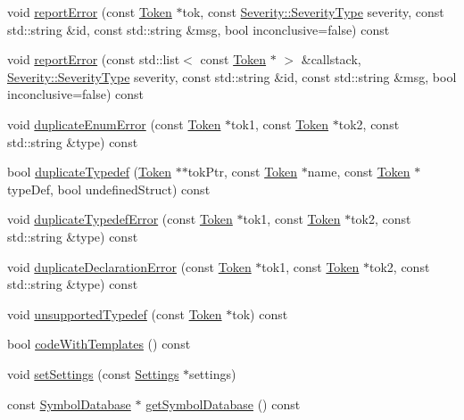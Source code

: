 \begin{DoxyCompactItemize}
\item 
void \hyperlink{class_tokenizer_a1147d0be1846ad886ad5e45c58d7d979}{report\-Error} (const \hyperlink{class_token}{Token} $\ast$tok, const \hyperlink{class_severity_ac185938ae084355bbf1790cf1a70caa6}{Severity\-::\-Severity\-Type} severity, const std\-::string \&id, const std\-::string \&msg, bool inconclusive=false) const 
\item 
void \hyperlink{class_tokenizer_a9a5827bede7b939d3f142049a84d22fc}{report\-Error} (const std\-::list$<$ const \hyperlink{class_token}{Token} $\ast$ $>$ \&callstack, \hyperlink{class_severity_ac185938ae084355bbf1790cf1a70caa6}{Severity\-::\-Severity\-Type} severity, const std\-::string \&id, const std\-::string \&msg, bool inconclusive=false) const 
\item 
void \hyperlink{class_tokenizer_a87ec82f8bb7fc338d444782cea181694}{duplicate\-Enum\-Error} (const \hyperlink{class_token}{Token} $\ast$tok1, const \hyperlink{class_token}{Token} $\ast$tok2, const std\-::string \&type) const 
\item 
bool \hyperlink{class_tokenizer_aa96ad648dc25a43c6c098fde70b3320f}{duplicate\-Typedef} (\hyperlink{class_token}{Token} $\ast$$\ast$tok\-Ptr, const \hyperlink{class_token}{Token} $\ast$name, const \hyperlink{class_token}{Token} $\ast$type\-Def, bool undefined\-Struct) const 
\item 
void \hyperlink{class_tokenizer_aeaf4716d4831853eb495f159eca3c00b}{duplicate\-Typedef\-Error} (const \hyperlink{class_token}{Token} $\ast$tok1, const \hyperlink{class_token}{Token} $\ast$tok2, const std\-::string \&type) const 
\item 
void \hyperlink{class_tokenizer_adc89d8167c143f4644dac7a9ddc890f8}{duplicate\-Declaration\-Error} (const \hyperlink{class_token}{Token} $\ast$tok1, const \hyperlink{class_token}{Token} $\ast$tok2, const std\-::string \&type) const 
\item 
void \hyperlink{class_tokenizer_a521e1212c8eb262e6f8208c24facf1c1}{unsupported\-Typedef} (const \hyperlink{class_token}{Token} $\ast$tok) const 
\item 
bool \hyperlink{class_tokenizer_af117d1e89be213c115c7944f686fcfd9}{code\-With\-Templates} () const 
\item 
void \hyperlink{class_tokenizer_a82ec7637b07ea82345c8aaf4f9b4f75d}{set\-Settings} (const \hyperlink{class_settings}{Settings} $\ast$settings)
\item 
const \hyperlink{class_symbol_database}{Symbol\-Database} $\ast$ \hyperlink{class_tokenizer_a237fb56960ffd28d04f0a7787e750f68}{get\-Symbol\-Database} () const 
$$
\end{DoxyCompactItemize}
